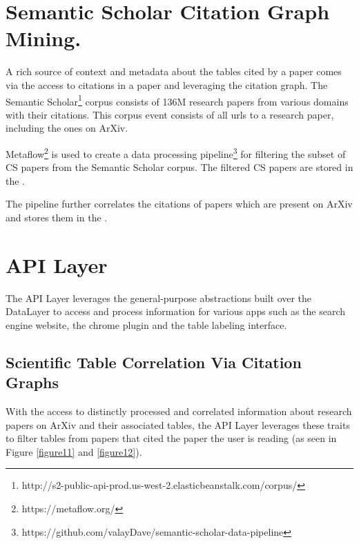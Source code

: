 \section{Semantic Scholar Citation Graph Mining.}
\label{sci-genie-core:citation-mining}
A rich source of context and metadata about the tables cited by a paper comes via the access to citations in a paper and leveraging the citation graph. The Semantic Scholar\footnote{http://s2-public-api-prod.us-west-2.elasticbeanstalk.com/corpus/} corpus consists of 136M research papers from various domains with their citations. This corpus event consists of all urls to a research paper, including the ones on ArXiv.  

Metaflow\footnote{https://metaflow.org/} is used to create a data processing pipeline\footnote{https://github.com/valayDave/semantic-scholar-data-pipeline} for filtering the subset of CS papers from the Semantic Scholar corpus. The filtered CS papers are stored in the . 

The pipeline further correlates the citations of papers which are present on ArXiv and stores them in the . 

\section{API Layer}
The API Layer leverages the general-purpose abstractions built over the DataLayer to access and process information for various apps such as the search engine website, the chrome plugin and the table labeling interface. 

\subsection{Scientific Table Correlation Via Citation Graphs}
With the access to distinctly processed and correlated information about research papers on ArXiv and their associated tables, the API Layer leverages these traits to filter tables from papers that cited the paper the user is reading (as seen in Figure \ref{figure11} and \ref{figure12}). 


